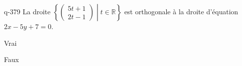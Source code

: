 \begin{truefalse}{q-379}
La droite  $\left\{\begin{pmatrix}5t+1\\2t-1\end{pmatrix}\middle| t\in\mathbb{R}\right\}$ est orthogonale à la droite d'équation $2x-5y+7=0$.
\item Vrai
\item* Faux
\end{truefalse}

